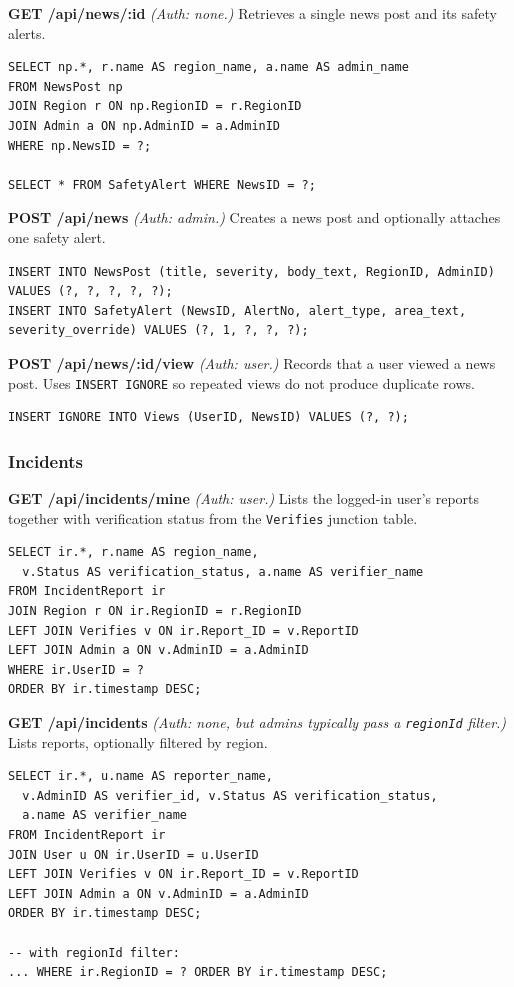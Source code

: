 \textbf{GET /api/news/:id} \textit{(Auth: none.)}
Retrieves a single news post and its safety alerts.
\begin{lstlisting}[language=MySQL]
SELECT np.*, r.name AS region_name, a.name AS admin_name
FROM NewsPost np
JOIN Region r ON np.RegionID = r.RegionID
JOIN Admin a ON np.AdminID = a.AdminID
WHERE np.NewsID = ?;

SELECT * FROM SafetyAlert WHERE NewsID = ?;
\end{lstlisting}

\textbf{POST /api/news} \textit{(Auth: admin.)}
Creates a news post and optionally attaches one safety alert.
\begin{lstlisting}[language=MySQL]
INSERT INTO NewsPost (title, severity, body_text, RegionID, AdminID) VALUES (?, ?, ?, ?, ?);
INSERT INTO SafetyAlert (NewsID, AlertNo, alert_type, area_text, severity_override) VALUES (?, 1, ?, ?, ?);
\end{lstlisting}

\textbf{POST /api/news/:id/view} \textit{(Auth: user.)}
Records that a user viewed a news post. Uses \texttt{INSERT IGNORE} so repeated views do not produce duplicate rows.
\begin{lstlisting}[language=MySQL]
INSERT IGNORE INTO Views (UserID, NewsID) VALUES (?, ?);
\end{lstlisting}

\subsubsection{Incidents}

\textbf{GET /api/incidents/mine} \textit{(Auth: user.)}
Lists the logged-in user's reports together with verification status from the \texttt{Verifies} junction table.
\begin{lstlisting}[language=MySQL]
SELECT ir.*, r.name AS region_name,
  v.Status AS verification_status, a.name AS verifier_name
FROM IncidentReport ir
JOIN Region r ON ir.RegionID = r.RegionID
LEFT JOIN Verifies v ON ir.Report_ID = v.ReportID
LEFT JOIN Admin a ON v.AdminID = a.AdminID
WHERE ir.UserID = ?
ORDER BY ir.timestamp DESC;
\end{lstlisting}

\textbf{GET /api/incidents} \textit{(Auth: none, but admins typically pass a \texttt{regionId} filter.)}
Lists reports, optionally filtered by region.
\begin{lstlisting}[language=MySQL]
SELECT ir.*, u.name AS reporter_name,
  v.AdminID AS verifier_id, v.Status AS verification_status,
  a.name AS verifier_name
FROM IncidentReport ir
JOIN User u ON ir.UserID = u.UserID
LEFT JOIN Verifies v ON ir.Report_ID = v.ReportID
LEFT JOIN Admin a ON v.AdminID = a.AdminID
ORDER BY ir.timestamp DESC;

-- with regionId filter:
... WHERE ir.RegionID = ? ORDER BY ir.timestamp DESC;
\end{lstlisting}


